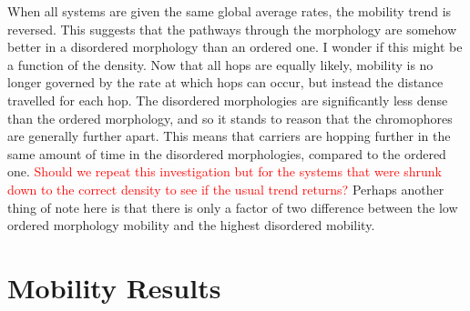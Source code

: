 \documentclass[12pt]{article}
\begin{document}
When all systems are given the same global average rates, the mobility trend is reversed.
This suggests that the pathways through the morphology are somehow better in a disordered morphology than an ordered one.
I wonder if this might be a function of the density.
Now that all hops are equally likely, mobility is no longer governed by the rate at which hops can occur, but instead the distance travelled for each hop.
The disordered morphologies are significantly less dense than the ordered morphology, and so it stands to reason that the chromophores are generally further apart.
This means that carriers are hopping further in the same amount of time in the disordered morphologies, compared to the ordered one.
\textcolor{red}{Should we repeat this investigation but for the systems that were shrunk down to the correct density to see if the usual trend returns?}
Perhaps another thing of note here is that there is only a factor of two difference between the low ordered morphology mobility and the highest disordered mobility.


\section{Mobility Results}
\end{document}

